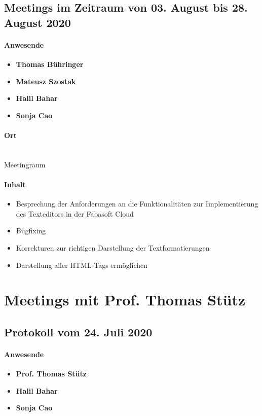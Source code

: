 \subsection{Meetings im Zeitraum von 03. August bis 28. August 2020}
\paragraph{Anwesende}
\begin{itemize}
	\item{\textbf{Thomas Bühringer}}
	\item{\textbf{Mateusz Szostak}}
	\item{\textbf{Halil Bahar}}
	\item{\textbf{Sonja Cao}}
\end{itemize}

\paragraph{Ort}\mbox{}\\
Meetingraum

\paragraph{Inhalt}
\begin{itemize}
	\item Besprechung der Anforderungen an die Funktionalitäten zur Implementierung des Texteditors in der Fabasoft Cloud
	\item Bugfixing
	\item Korrekturen zur richtigen Darstellung der Textformatierungen
	\item Darstellung aller HTML-Tags ermöglichen
\end{itemize}

\section{Meetings mit Prof. Thomas Stütz}
\subsection{Protokoll vom 24. Juli 2020}
\paragraph{Anwesende}
\begin{itemize}
	\item{\textbf{Prof. Thomas Stütz}}
	\item{\textbf{Halil Bahar}}
	\item{\textbf{Sonja Cao}}
\end{itemize}

